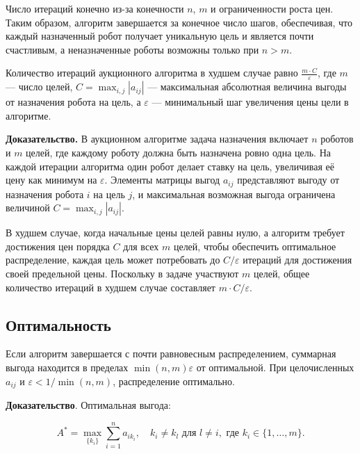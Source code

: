 Число итераций конечно из-за конечности \( n \), \( m \) и ограниченности роста цен. Таким образом, алгоритм завершается за конечное число шагов, обеспечивая, что каждый назначенный робот получает уникальную цель и является почти счастливым, а неназначенные роботы возможны только при \( n > m \).

\begin{theorem}
\label{thm:auction_iterations}
Количество итераций аукционного алгоритма в худшем случае равно \( \frac{m \cdot C}{\varepsilon} \), где \( m \) — число целей, \( C = \max_{i,j} |a_{ij}| \) — максимальная абсолютная величина выгоды от назначения робота на цель, а \( \varepsilon \) — минимальный шаг увеличения цены цели в алгоритме.
\end{theorem}

\textbf{Доказательство.}  
В аукционном алгоритме задача назначения включает \( n \) роботов и \( m \) целей, где каждому роботу должна быть назначена ровно одна цель. На каждой итерации алгоритма один робот делает ставку на цель, увеличивая её цену как минимум на \( \varepsilon \). Элементы матрицы выгод \( a_{ij} \) представляют выгоду от назначения робота \( i \) на цель \( j \), и максимальная возможная выгода ограничена величиной \( C = \max_{i,j} |a_{ij}| \). 

В худшем случае, когда начальные цены целей равны нулю, а алгоритм требует достижения цен порядка \( C \) для всех \( m \) целей, чтобы обеспечить оптимальное распределение, каждая цель может потребовать до \( C / \varepsilon \) итераций для достижения своей предельной цены. Поскольку в задаче участвуют \( m \) целей, общее количество итераций в худшем случае составляет \( m \cdot C / \varepsilon \).

\subsection{Оптимальность}
\begin{theorem}
\label{thm:auction_optimality}
Если алгоритм завершается с почти равновесным распределением, суммарная выгода находится в пределах \( \min(n, m) \varepsilon \) от оптимальной. При целочисленных \( a_{ij} \) и \( \varepsilon < 1/\min(n, m) \), распределение оптимально.
\end{theorem}

\textbf{Доказательство}. Оптимальная выгода:

\[
A^* = \max_{\{k_i\}} \sum_{i=1}^n a_{i k_i}, \quad k_i \neq k_l \text{ для } l \neq i, \text{ где } k_i \in \{1, \ldots, m\}.
\]


